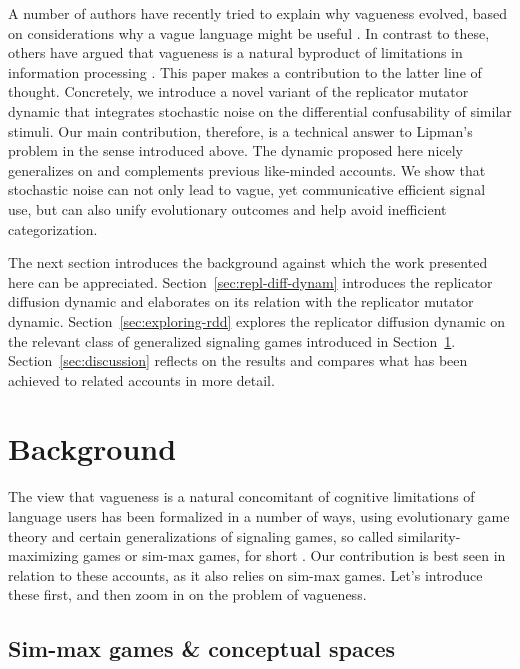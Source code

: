 A number of authors have recently tried to explain why vagueness
evolved, based on considerations why a vague language might be useful
\citep[e.g.][]{Jaegherde-Jaegher2003:A-Game-Theoreti,Deemter2009:Utility-and-Lan,Jaegherde-JaegherRooijvan-Rooij2010:Strategic-Vague,BlumeBoard2013:Intentional-Vag}. In
contrast to these, others have argued that vagueness is a natural
byproduct of limitations in information processing
\citep[e.g.][]{FrankeJager2010:Vagueness-Signa,OConnor2013:The-Evolution-o,QingFranke2014:Gradable-Adject}. This
paper makes a contribution to the latter line of thought.  Concretely,
we introduce a novel variant of the replicator mutator dynamic that
integrates stochastic noise on the differential confusability of
similar stimuli. Our main contribution, therefore, is a technical
answer to Lipman's problem in the sense introduced above. The dynamic
proposed here nicely generalizes on and complements previous like-minded
accounts. We show that stochastic noise can not only lead to
vague, yet communicative efficient signal use, but can also unify
evolutionary outcomes and help avoid inefficient categorization.

The next section introduces the background against which the work
presented here can be appreciated. Section~\ref{sec:repl-diff-dynam}
introduces the replicator diffusion dynamic and elaborates on its
relation with the replicator mutator
dynamic. Section~\ref{sec:exploring-rdd} explores the replicator
diffusion dynamic on the relevant class of generalized signaling games
introduced in
Section~\ref{sec:background}. Section~\ref{sec:discussion} reflects on
the results and compares what has been achieved to related accounts in
more detail. 

\section{Background}
\label{sec:background}

The view that vagueness is a natural concomitant of cognitive
limitations of language users has been formalized in a number of ways,
using evolutionary game theory and certain generalizations of
signaling games, so called similarity-maximizing games or sim-max
games, for short
\citep{FrankeJager2010:Vagueness-Signa,OConnor2013:Evolving-Percep,OConnor2013:The-Evolution-o}. Our
contribution is best seen in relation to these accounts, as it also
relies on sim-max games. Let's introduce these first, and then zoom in
on the problem of vagueness.

\subsection{Sim-max games \& conceptual spaces}

